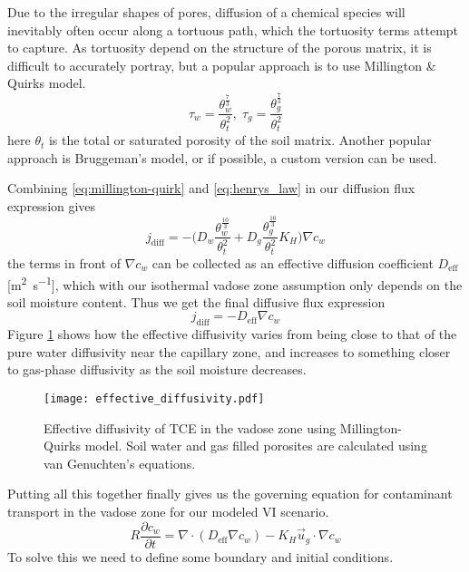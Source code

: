 Due to the irregular shapes of pores, diffusion of a chemical species will inevitably often occur along a tortuous path, which the tortuosity terms attempt to capture.
As tortuosity depend on the structure of the porous matrix, it is difficult to accurately portray, but a popular approach is to use Millington \& Quirks model\cite{millington_permeability_1961}.
\begin{equation}\label{eq:millington-quirk}
  \tau_w = \frac{\theta_w^{\frac{7}{3}}}{\theta_t^2}, \; \tau_g = \frac{\theta_g^{\frac{7}{3}}}{\theta_t^2}
\end{equation}
here $\theta_t$ is the total or saturated porosity of the soil matrix.
Another popular approach is Bruggeman's model, or if possible, a custom version can be used.\par %

Combining \eqref{eq:millington-quirk} and \eqref{eq:henrys_law} in our diffusion flux expression gives
\begin{equation}
  j_\mathrm{diff} = -\Big(D_w \frac{\theta_w^{\frac{10}{3}}}{\theta_t^2} + D_g \frac{\theta_g^{\frac{10}{3}}}{\theta_t^2} K_H\Big) \nabla c_w
\end{equation}
the terms in front of $\nabla c_w$ can be collected as an effective diffusion coefficient $D_\mathrm{eff}$ [\si{\metre\squared\per\second}], which with our isothermal vadose zone assumption only depends on the soil moisture content.
Thus we get the final diffusive flux expression
\begin{equation}
  j_\mathrm{diff} = - D_\mathrm{eff}\nabla c_w
\end{equation}
Figure \ref{fig:D_eff} shows how the effective diffusivity varies from being close to that of the pure water diffusivity near the capillary zone, and increases to something closer to gas-phase diffusivity as the soil moisture decreases.\par

\begin{figure}
  \texttt{[image: effective\_diffusivity.pdf]}
  \caption{Effective diffusivity of TCE in the vadose zone using Millington-Quirks model. Soil water and gas filled porosites are calculated using van Genuchten's equations.}
  \label{fig:D_eff}
\end{figure}

Putting all this together finally gives us the governing equation for contaminant transport in the vadose zone for our modeled VI scenario.
\begin{equation}\label{eq:mass_transport}
  R \frac{\partial c_w}{\partial t} = \nabla \cdot (D_\mathrm{eff} \nabla c_w) - K_H \vec{u}_g \cdot \nabla c_w
\end{equation}
To solve this we need to define some boundary and initial conditions.\par

